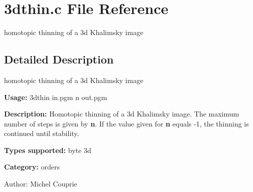 \section{3dthin.c File Reference}
\label{3dthin_8c}
homotopic thinning of a 3d Khalimsky image 



\subsection{Detailed Description}
homotopic thinning of a 3d Khalimsky image 

{\bf Usage:} 3dthin in.pgm n out.pgm

{\bf Description:} Homotopic thinning of a 3d Khalimsky image. The maximum number of steps is given by {\bf n}. If the value given for {\bf n} equals -1, the thinning is continued until stability.

{\bf Types supported:} byte 3d

{\bf Category:} orders

\begin{Desc}
\item[Author:]Michel Couprie \end{Desc}
